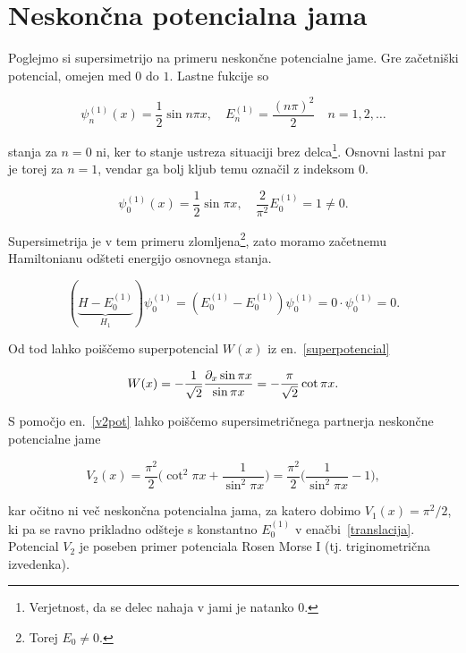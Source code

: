 \section{Neskon\v cna potencialna jama}

Poglejmo si supersimetrijo na primeru neskon\v cne potencialne jame. Gre za\v cetni\v ski potencial, 
omejen med $0$ do $1$. Lastne fukcije so 

\begin{equation}
	\psi_n^{(1)} (x) = \frac{1}{2}\sin n\pi x, \quad E_n^{(1)} = \frac{(n\pi)^2}{2}
		\quad n = 1,2,\ldots
\end{equation}

\ni stanja za $n = 0$ ni, ker to stanje ustreza situaciji brez delca\footnote{Verjetnost, da se delec nahaja v jami
je natanko 0.}. Osnovni lastni par je torej za $n = 1$, vendar ga bolj kljub temu ozna\v cil z indeksom 0.

\begin{equation}
	\psi_0^{(1)} (x) = \frac{1}{2}\sin\pi x, \quad \frac{2}{\pi^2}E_0^{(1)} = 1 \neq 0.
\end{equation}

\ni Supersimetrija je v tem primeru zlomljena\footnote{Torej $E_0 \neq 0$.}, zato moramo za\v cetnemu Hamiltonianu
od\v steti energijo osnovnega stanja.

\begin{equation}
	(\underbrace{H - E_0^{(1)}}_{H_1})\psi_0^{(1)} = (E_0^{(1)} - E_0^{(1)})\psi_0^{(1)} =
		0\cdot\psi_0^{(1)} = 0. \label{translacija}
\end{equation}

\ni Od tod lahko poi\v s\v cemo superpotencial $W(x)$ iz en.~\eqref{superpotencial}

\begin{equation}
	W(x) = -\frac{1}{\sqrt{2}} \frac{\partial_x \sin \pi x}{\sin \pi x} = -\frac{\pi}{\sqrt{2}}\cot \pi x.
\end{equation}

\ni S pomo\v cjo en.~\eqref{v2pot} lahko poi\v s\v cemo supersimetri\v cnega partnerja neskon\v cne potencialne jame

\begin{equation}
	V_2 (x) = \frac{\pi^2}{2}\bigg(\cot^2 \pi x + \frac{1}{\sin^2 \pi x}\bigg)
		= \frac{\pi^2}{2}\bigg(\frac{1}{\sin^2 \pi x} - 1\bigg),
	\label{pot-nes-jama}
\end{equation}

\ni kar o\v citno ni ve\v c neskon\v cna potencialna jama, za katero dobimo $V_1(x) = \pi^2/2$, ki pa se ravno
prikladno od\v steje s konstantno $E_0^{(1)}$ v ena\v cbi~\eqref{translacija}. Potencial $V_2$ je poseben primer
potenciala Rosen Morse I (tj. triginometri\v cna izvedenka).

